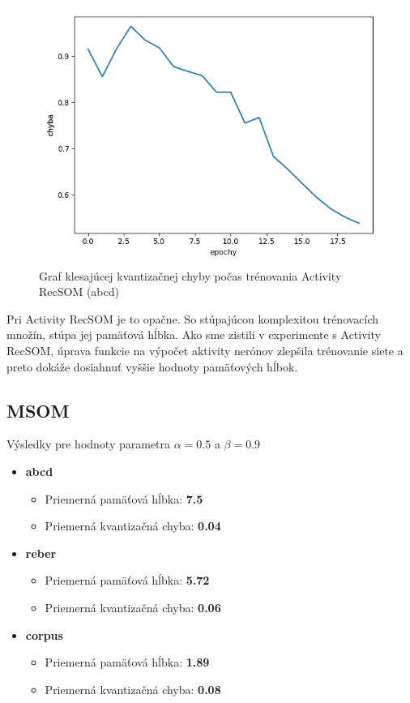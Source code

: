 \begin{figure}[H]
    \centering
    \includegraphics[width=\textwidth]{assets/ra_error_top}
    \caption{Graf klesajúcej kvantizačnej chyby počas trénovania Activity RecSOM (abcd)}
\end{figure}

Pri Activity RecSOM je to opačne. So stúpajúcou komplexitou trénovacích množín, 
stúpa jej pamäťová hĺbka. Ako sme zistili v experimente s Activity RecSOM, úprava funkcie 
na výpočet aktivity nerónov zlepšila trénovanie siete a preto dokáže dosiahnuť vyššie hodnoty
pamäťových hĺbok.


\subsection{MSOM}
Výsledky pre hodnoty parametra $\alpha = 0.5$ a $\beta = 0.9$
\begin{itemize}
    \item \textbf{abcd}
    \begin{itemize}
        \item Priemerná pamäťová hĺbka: \textbf{7.5}
        \item Priemerná kvantizačná chyba: \textbf{0.04}
    \end{itemize}
    \item \textbf{reber}
    \begin{itemize}
        \item Priemerná pamäťová hĺbka: \textbf{5.72}
        \item Priemerná kvantizačná chyba: \textbf{0.06}
    \end{itemize}
    \item \textbf{corpus}
    \begin{itemize}
        \item Priemerná pamäťová hĺbka: \textbf{1.89}
        \item Priemerná kvantizačná chyba: \textbf{0.08}
    \end{itemize}
\end{itemize}


